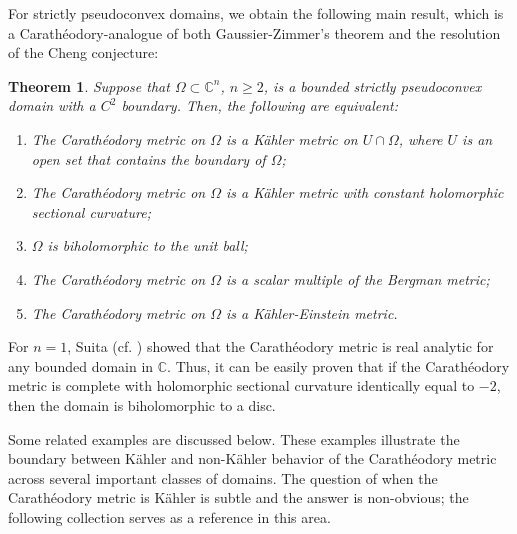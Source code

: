 \documentclass[12pt] {article}
\newtheorem{theorem}{Theorem}[section]
\numberwithin{equation}{section}
\begin{document}
 
 
 For strictly pseudoconvex domains, we obtain the following main result, which is a Carath\'eodory-analogue of both Gaussier-Zimmer's theorem and the resolution of the Cheng conjecture:
 
            

\begin{theorem} \label{Main}
Suppose that $\Omega \subset \mathbb{C}^n$, $n \geq 2$, is a bounded strictly pseudoconvex domain with a $C^2$ boundary. Then, the following are equivalent:
\begin{enumerate}
\item [$(1)$] The Carath\'eodory metric on $\Omega$ is a K\"ahler metric on $U \cap \Omega$, where $U$ is an open set that contains the boundary of $\Omega$;
\item [$(2)$] The Carath\'eodory metric on $\Omega$ is a K\"ahler metric with constant holomorphic sectional curvature;
\item [$(3)$] $\Omega$ is biholomorphic to the unit ball;
\item [$(4)$] The Carath\'eodory metric on $\Omega$ is a scalar multiple of the Bergman metric;
\item [$(5)$] The Carath\'eodory metric on $\Omega$ is a K\"ahler-Einstein metric.
\end{enumerate}
\end{theorem}


     \medskip
     
For $n=1$, Suita \cite{Su73} (cf. \cite{Burbea}) showed that the
Carath\'eodory metric is real analytic for any bounded domain in $\mathbb{C}$.  
Thus, it can be easily proven that if the Carath\'eodory metric is 
 complete with holomorphic sectional curvature identically equal to $-2$, then the domain 
is biholomorphic to a disc.  
 

 


 

 



     \medskip

Some related examples are discussed below. These examples illustrate the boundary between K\"ahler and non-K\"ahler behavior of the Carath\'eodory metric across several important classes of domains. The question of when the Carath\'eodory metric is K\"ahler is subtle and the answer is non-obvious; the following collection serves as a reference in this area.

\bigskip
\end{document}
